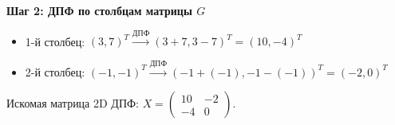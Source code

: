 \documentclass[12pt,a4paper]{article}
\begin{document}
\textbf{Шаг 2: ДПФ по столбцам матрицы $G$}
\begin{itemize}
    \item 1-й столбец: $(3, 7)^T \xrightarrow{ДПФ} (3+7, 3-7)^T = (10, -4)^T$
    \item 2-й столбец: $(-1, -1)^T \xrightarrow{ДПФ} (-1+(-1), -1-(-1))^T = (-2, 0)^T$
\end{itemize}

Искомая матрица 2D ДПФ:
$ X = \begin{pmatrix} 10 & -2 \\ -4 & 0 \end{pmatrix} $.
\end{document}
